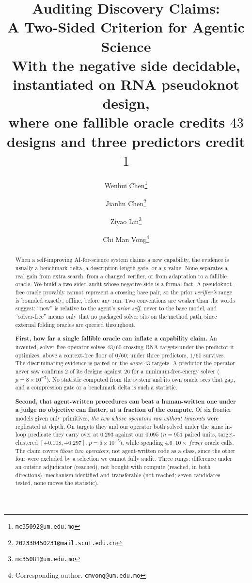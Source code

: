\documentclass[11pt]{article}
\title{\textbf{Auditing Discovery Claims:\\A Two-Sided Criterion for Agentic Science}\\[5pt]
\large With the negative side decidable, instantiated on RNA pseudoknot design,\\
where one fallible oracle credits $43$ designs and three predictors credit $1$}
\author[]{}
\affil[]{\vspace{-2.2em}}
\author[1]{Wenhui Chen\thanks{\texttt{mc35092@um.edu.mo}}}
\author[2]{Jianlin Chen\thanks{\texttt{202330450231@mail.scut.edu.cn}}}
\author[1]{Ziyao Lin\thanks{\texttt{mc35081@um.edu.mo}}}
\author[1]{Chi Man Vong\thanks{Corresponding author. \texttt{cmvong@um.edu.mo}}}
\affil[1]{University of Macau}
\affil[2]{South China University of Technology}
\date{}
\begin{document}
\maketitle

\begin{abstract}
\noindent When a self-improving AI-for-science system claims a new capability, the evidence is usually a
benchmark delta, a description-length gate, or a $p$-value. None separates a real gain from extra search, from
a changed verifier, or from adaptation to a fallible oracle. We build a two-sided audit whose negative side is
a formal fact. A pseudoknot-free oracle provably cannot represent a crossing base pair, so the prior
\emph{verifier's} range is bounded exactly, offline, before any run. Two conventions are weaker than the words
suggest: ``new'' is relative to the agent's \emph{prior self}, never to the base model, and ``solver-free''
means only that no packaged solver sits on the method path, since external folding oracles are queried
throughout.

\textbf{First, how far a single fallible oracle can inflate a capability claim.} An invented, solver-free
operator solves $43/60$ crossing RNA targets under the predictor it optimizes, above a context-free floor of
$0/60$; under three predictors, $1/60$ survives. The discriminating evidence is paired on the \emph{same} $43$
targets. A predictor the operator never saw confirms $2$ of its designs against $26$ for a
minimum-free-energy solver ($p{=}8\!\times\!10^{-7}$). No statistic computed from the system and its own
oracle sees that gap, and a compression gate or a benchmark delta is such a statistic.

\textbf{Second, that agent-written procedures can beat a human-written one under a judge no objective can
flatter, at a fraction of the compute.} Of six frontier models given only primitives, \emph{the two whose
operators ran without timeouts} were replicated at depth. On targets they and our operator both solved under
the same in-loop predicate they carry over at $0.293$ against our $0.095$ ($n{=}951$ paired units,
target-clustered $[{+}0.108,{+}0.297]$, $p{=}5\!\times\!10^{-5}$), while spending $4.6$--$10\times$
\emph{fewer} oracle calls. The claim covers \emph{those two operators}, not agent-written code as a class,
since the other four were excluded by a selection we cannot fully audit. Three rungs: difference under an
outside adjudicator (reached), not bought with compute (reached, in both directions), mechanism identified
and transferable (not reached; seven candidates tested, none moves the statistic).


\end{abstract}
\end{document}
